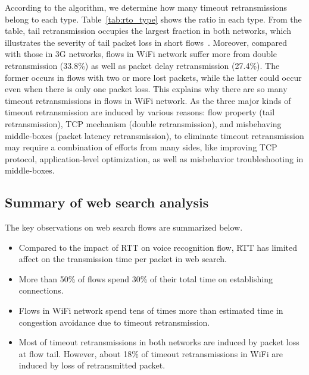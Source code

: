 According to the algorithm, we determine how many timeout retransmissions belong to each type. Table~\ref{tab:rto_type} shows the ratio in each type. From the table, tail retransmission occupies the largest fraction in both networks, which illustrates the severity of tail packet loss in short flows~\cite{flach2013reducing}. Moreover, compared with those in 3G networks, flows in WiFi network suffer more from double retransmission (33.8\%) as well as packet delay retransmission (27.4\%). The former occurs in flows with two or more lost packets, while the latter could occur even when there is only one packet loss. This explains why there are so many timeout retransmissions in flows in WiFi network. As the three major kinds of timeout retransmission are induced by various reasons: flow property (tail retransmission), TCP mechanism (double retransmission), and misbehaving middle-boxes (packet latency retransmission), to eliminate timeout retransmission may require a combination of efforts from many sides, like improving TCP protocol, application-level optimization, as well as misbehavior troubleshooting in middle-boxes.

\subsection{Summary of web search analysis}

The key observations on web search flows are summarized below.

\begin{itemize}
	\item Compared to the impact of RTT on voice recognition flow, RTT has limited affect on the transmission time per packet in web search.
	\item More than 50\% of flows spend 30\% of their total time on establishing connections.
	\item Flows in WiFi network spend tens of times more than estimated time in congestion avoidance due to timeout retransmission.
	\item Most of timeout retransmissions in both networks are induced by packet loss at flow tail. However, about 18\% of timeout retransmissions in WiFi are induced by loss of retransmitted packet.
\end{itemize}
